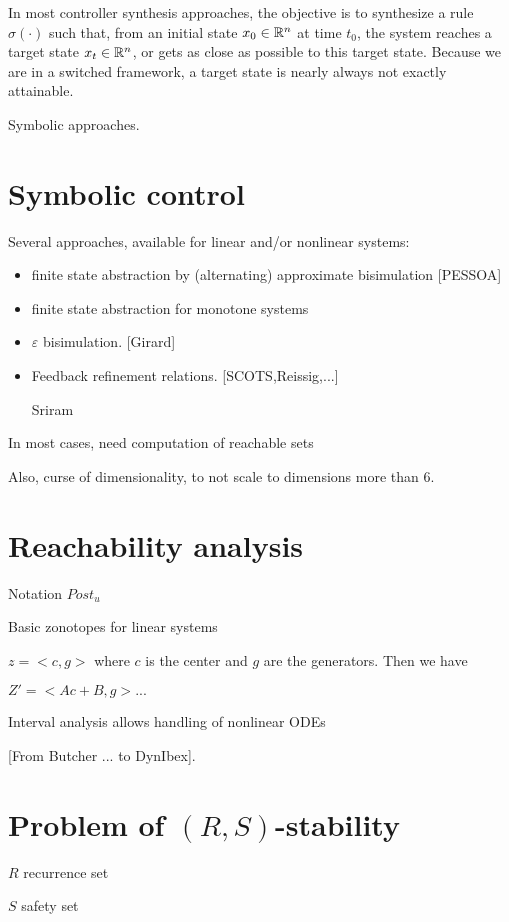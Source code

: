 In most controller synthesis approaches, the objective is to 
synthesize a rule $\sigma(\cdot)$ such that, from an initial 
state $x_0 \in \mathbb{R}^n$ at time $t_0$, the system reaches a target state $x_t \in \mathbb{R}^n$, or 
gets as close as possible to this target state.
Because we are in a switched framework, a target state is nearly always not 
exactly attainable. 

Symbolic approaches.


\section{Symbolic control}


Several approaches, available for linear and/or nonlinear systems: 
\begin{itemize}
  \item finite state abstraction by (alternating) approximate bisimulation [PESSOA]
  \item finite state abstraction for monotone systems
 \item $\varepsilon$ bisimulation. [Girard]
  \item Feedback refinement relations. [SCOTS,Reissig,...]
  \item [Sriram]
\end{itemize}

In most cases, need computation of reachable sets

Also, curse of dimensionality, to not scale to dimensions more than $6$.


\section{Reachability analysis}

Notation $Post_u$

Basic zonotopes for linear systems

$z=<c,g>$ where $c$ is the center and $g$ are the generators. Then we have

$Z' = <Ac + B,g>...$

Interval analysis allows handling of nonlinear ODEs

[From Butcher ... to DynIbex].


\section{Problem of $(R,S)$-stability}

$R$ recurrence set

$S$ safety set

